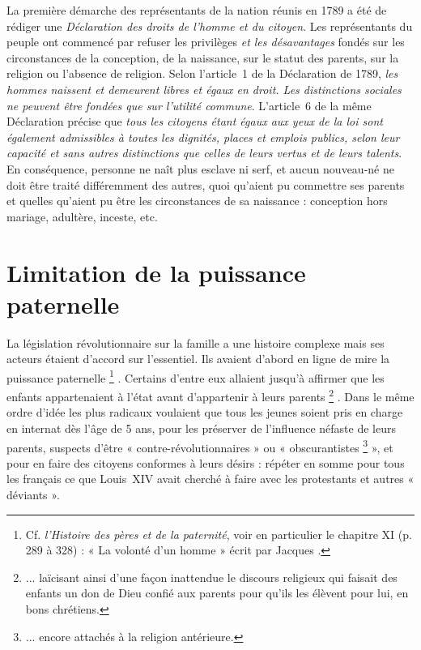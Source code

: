 

%
 La première démarche des représentants de la nation réunis en 1789 a été de rédiger une \emph{Déclaration des droits de l'homme et du citoyen}. Les représentants du peuple ont commencé par refuser les privilèges \emph{et les désavantages} fondés sur les circonstances de la conception, de la naissance, sur le statut des parents, sur la religion ou l'absence de religion. Selon l'article~1 de la Déclaration de 1789, \emph{les hommes naissent et demeurent libres et égaux en droit. Les distinctions sociales ne peuvent être fondées que sur l'utilité commune}. L'article~6 de la même Déclaration précise que \emph{tous les citoyens étant égaux aux yeux de la loi sont également admissibles à toutes les dignités, places et emplois publics, selon leur capacité et sans autres distinctions que celles de leurs vertus et de leurs talents}. En conséquence, personne ne naît plus esclave ni serf, et aucun nouveau-né ne doit être traité différemment des autres, quoi qu'aient pu commettre ses parents et quelles qu'aient pu être les circonstances de sa naissance : conception hors mariage, adultère, inceste, etc. 


\section{Limitation de la puissance paternelle}

 La législation révolutionnaire sur la famille a une histoire complexe mais ses acteurs étaient d'accord sur l'essentiel. Ils avaient d'abord en ligne de mire la puissance paternelle%
\footnote{Cf. \emph{l'Histoire des pères et de la paternité}, voir en particulier le chapitre XI (p. 289 à 328) : « La volonté d'un homme » écrit par Jacques .}%
. Certains d'entre eux allaient jusqu'à affirmer que les enfants appartenaient à l'état avant d'appartenir à leurs parents%
\footnote{... laïcisant ainsi d'une façon inattendue le discours religieux qui faisait des enfants un don de Dieu confié aux parents pour qu'ils les élèvent pour lui, en bons chrétiens.}%
. Dans le même ordre d'idée les plus radicaux voulaient que tous les jeunes soient pris en charge en internat dès l'âge de 5 ans, pour les préserver de l'influence néfaste de leurs parents, suspects d'être {« contre-révolutionnaires »} ou « {obscurantistes}%
\footnote{... encore attachés à la religion antérieure.} 
», et pour en faire des citoyens conformes à leurs désirs : répéter en somme pour tous les français ce que Louis~XIV avait cherché à faire avec les protestants et autres « déviants ».

